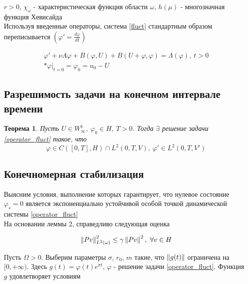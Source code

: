 $r > 0$, $\chi_{\omega}$ - характеристическая функция области $\omega$,
$h(\mu)$ - многозначная функция Хевисайда\\

Используя введенные операторы, система \eqref{fluct} стандартным образом
переписывается $(\varphi' = \frac{d\varphi}{dt})$

\begin{gather}\label{operator_fluct}
    \varphi' + \nu A\varphi + B(\varphi, U) + B(U + \varphi, \varphi) =
    \Lambda(\varphi), \ t > 0 \\*
    \varphi|_{t = 0} = \varphi_0 = u_0 - U
\end{gather}

\subsection{Разрешимость задачи на конечном интервале времени}

\newtheorem{theorem}{Теорема}

\begin{theorem}
    Пусть $U \in W^1_{\infty}, \ \varphi_0 \in H, \ T > 0$. 
    Тогда $\exists$ решение задачи \eqref{operator_fluct} такое, что
    $$\varphi \in C([0, T], H) \cap L^2(0, T, V), \ \varphi' \in L^2(0, T, V')$$
\end{theorem}


\subsection{Конечномерная стабилизация}

Выясним условия, выполнение которых гарантирует, что нулевое состояние
$\varphi_s = 0$ является экспоненциально устойчивой особой точкой динамической
системы \eqref{operator_fluct}\\

На основании леммы 2, справедливо следующая оценка

\begin{equation}\label{lemma2_mark}
    \left\lVert Pv\right\rVert^2_{L^2(\omega)} \le \gamma \left\lVert Pv\right\rVert^2, \ \forall v \in H
\end{equation}

Пусть $\Omega > 0$. Выберим параметры $\sigma$, $r_0$, $m$ такие, что
$\left\lVert g(t)\right\rVert$ ограничена на $[0, +\infty)$. Здесь $g(t) = \varphi(t)e^{\sigma t}$, 
$\varphi$ - решение задачи \eqref{operator_fluct}. Функция $g$ удовлетворяет 
условиям

